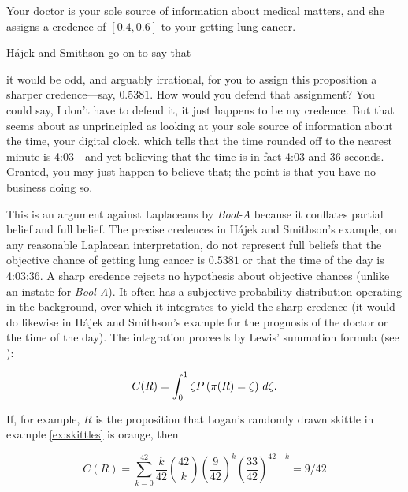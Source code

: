 \documentclass[11pt]{article}
\newcommand{\anderson}[0]{\textit{Bool-A}}
\begin{document}
\begin{quotex}
  \label{ex:crude} Your doctor is your
  sole source of information about medical matters, and she assigns a
  credence of $[0.4,0.6]$ to your getting lung cancer.
\end{quotex}

H{\'a}jek and Smithson go on to say that 

\begin{quotex}
  it would be odd, and arguably irrational, for you to assign this
  proposition a sharper credence---say, $0.5381$. How would you defend
  that assignment? You could say, I don't have to defend it, it just
  happens to be my credence. But that seems about as unprincipled as
  looking at your sole source of information about the time, your
  digital clock, which tells that the time rounded off to the nearest
  minute is 4:03---and yet believing that the time is in fact 4:03 and
  36 seconds. Granted, you may just happen to believe that; the point
  is that you have no business doing so.
\end{quotex}

This is an argument against Laplaceans by {\anderson} because it
conflates partial belief and full belief. The precise credences in
H{\'a}jek and Smithson's example, on any reasonable Laplacean
interpretation, do not represent full beliefs that the objective
chance of getting lung cancer is $0.5381$ or that the time of the day
is 4:03:36. A sharp credence rejects no hypothesis about objective
chances (unlike an instate for {\anderson}). It often has a subjective
probability distribution operating in the background, over which it
integrates to yield the sharp credence (it would do likewise in
H{\'a}jek and Smithson's example for the prognosis of the doctor or
the time of the day). The integration proceeds by Lewis'
summation formula (see ):

\begin{equation}
  \label{eq:s2}
  C(R)=\int_{0}^{1}\zeta{}P\left(\pi(R)=\zeta\right)\,d\zeta{}.\bcut{21}
\end{equation}

{\noindent}If, for example, $R$ is the proposition that Logan's
randomly drawn skittle in example \ref{ex:skittles} is orange, then

\begin{equation}
  \label{eq:skit}
  C(R)=\sum_{k=0}^{42}\frac{k}{42}\binom{42}{k}\left(\frac{9}{42}\right)^{k}\left(\frac{33}{42}\right)^{42-k}=9/42
\end{equation}
\end{document}
